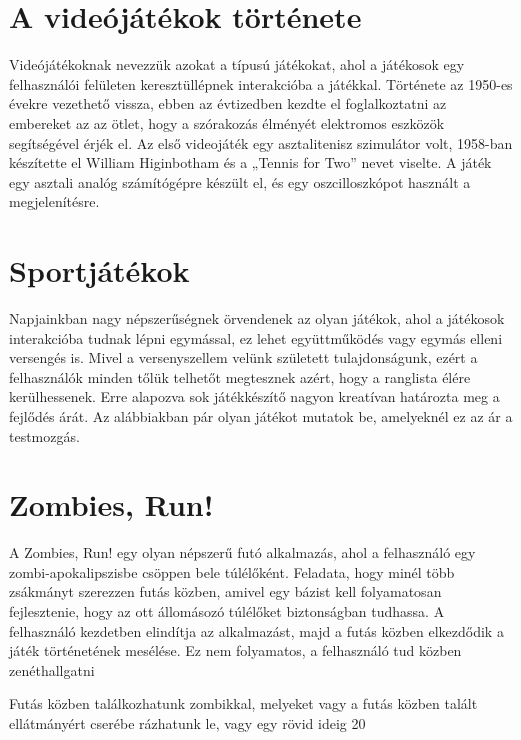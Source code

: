 
\section{A videójátékok története}
\label{resz2_1}


Videójátékoknak nevezzük azokat a típusú játékokat, ahol a játékosok egy felhasználói felületen keresztüllépnek interakcióba a játékkal. Története az 1950-es évekre vezethető vissza, ebben az évtizedben kezdte el foglalkoztatni az embereket az az ötlet, hogy a szórakozás élményét elektromos eszközök segítségével érjék el. Az első videojáték egy asztalitenisz szimulátor volt, 1958-ban készítette el William Higinbotham és a „Tennis for Two” nevet viselte. A játék egy asztali analóg számítógépre készült el, és egy oszcilloszkópot használt a megjelenítésre.

\section{Sportjátékok}
\label{resz2_2}

Napjainkban nagy népszerűségnek örvendenek az olyan játékok, ahol a játékosok interakcióba tudnak lépni egymással, ez lehet együttműködés vagy egymás elleni versengés is. Mivel a versenyszellem velünk született tulajdonságunk, ezért a felhasználók minden tőlük telhetőt megtesznek azért, hogy a ranglista élére kerülhessenek. Erre alapozva sok játékkészítő nagyon kreatívan határozta meg a fejlődés árát. Az alábbiakban pár olyan játékot mutatok be, amelyeknél ez az ár a testmozgás.

\section*{Zombies, Run!}
\label{resz2_2_1}

A Zombies, Run! egy olyan népszerű futó alkalmazás, ahol a felhasználó egy zombi-apokalipszisbe csöppen bele túlélőként. Feladata, hogy minél több zsákmányt szerezzen futás közben, amivel egy bázist kell folyamatosan fejlesztenie, hogy az ott állomásozó túlélőket biztonságban tudhassa. A felhasználó kezdetben elindítja az alkalmazást, majd a futás közben elkezdődik a játék történetének mesélése. Ez nem folyamatos, a felhasználó tud közben zenéthallgatni

Futás közben találkozhatunk zombikkal, melyeket vagy a futás közben talált ellátmányért cserébe rázhatunk le, vagy egy rövid ideig 20%

